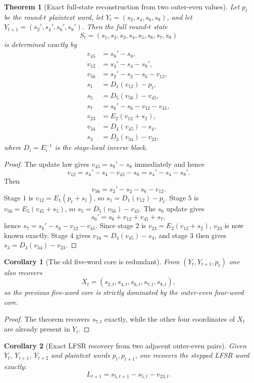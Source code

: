 \documentclass[11pt]{article}
\newtheorem{theorem}{Theorem}
\newtheorem{corollary}{Corollary}
\begin{document}
\begin{theorem}[Exact full-state reconstruction from two outer-even values]
Let $p_t$ be the round-$t$ plaintext word, let $Y_t=(s_2,s_4,s_6,s_8)$, and let $Y_{t+1}=(s_2',s_4',s_6',s_8')$. Then the full round-$t$ state
\[
S_t=(s_1,s_2,s_3,s_4,s_5,s_6,s_7,s_8)
\]
is determined exactly by
\begin{align*}
v_{45} &= s_8' - s_8,\\
v_{12} &= s_4' - s_4 - s_8',\\
v_{56} &= s_2' - s_2 - s_6 - v_{12},\\
s_1 &= D_1(v_{12}) - p_t,\\
s_5 &= D_5(v_{56}) - v_{45},\\
s_7 &= s_6' - s_6 - v_{12} - v_{45},\\
v_{23} &= E_2(v_{12}+s_2),\\
v_{34} &= D_4(v_{45}) - s_4,\\
s_3 &= D_3(v_{34}) - v_{23},
\end{align*}
where $D_i=E_i^{-1}$ is the stage-local inverse block.
\end{theorem}

\begin{proof}
The update law gives $v_{45}=s_8'-s_8$ immediately and hence
\[
v_{12}=s_4'-s_4-v_{45}-s_8 = s_4'-s_4-s_8'.
\]
Then
\[
v_{56}=s_2'-s_2-s_6-v_{12}.
\]
Stage $1$ is $v_{12}=E_1(p_t+s_1)$, so $s_1=D_1(v_{12})-p_t$. Stage $5$ is $v_{56}=E_5(v_{45}+s_5)$, so $s_5=D_5(v_{56})-v_{45}$. The $s_6$ update gives
\[
s_6'=s_6+v_{12}+v_{45}+s_7,
\]
hence $s_7=s_6'-s_6-v_{12}-v_{45}$. Since stage $2$ is $v_{23}=E_2(v_{12}+s_2)$, $v_{23}$ is now known exactly. Stage $4$ gives $v_{34}=D_4(v_{45})-s_4$, and stage $3$ then gives $s_3=D_3(v_{34})-v_{23}$.
\end{proof}

\begin{corollary}[The old five-word core is redundant]
From $(Y_t,Y_{t+1},p_t)$ one also recovers
\[
X_t=(s_{2,t},s_{4,t},s_{6,t},s_{7,t},s_{8,t}),
\]
so the previous five-word core is strictly dominated by the outer-even four-word core.
\end{corollary}

\begin{proof}
The theorem recovers $s_{7,t}$ exactly, while the other four coordinates of $X_t$ are already present in $Y_t$.
\end{proof}

\begin{corollary}[Exact LFSR recovery from two adjacent outer-even pairs]
Given $Y_t$, $Y_{t+1}$, $Y_{t+2}$ and plaintext words $p_t,p_{t+1}$, one recovers the stepped LFSR word exactly:
\[
L_{t+1}=s_{5,t+1}-s_{5,t}-v_{23,t}.
\]
\end{corollary}
\end{document}
